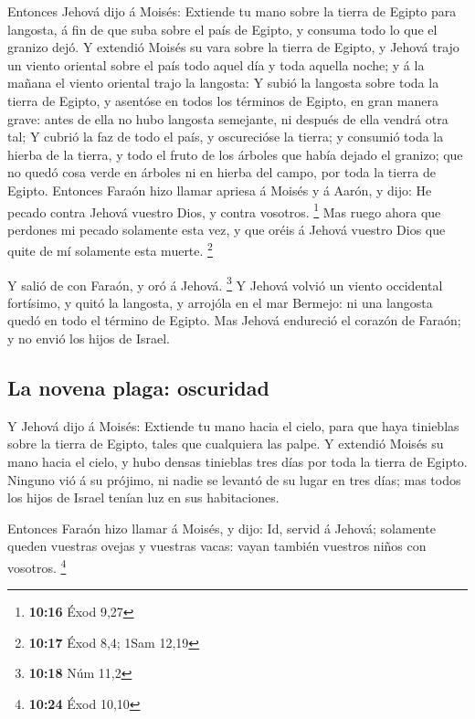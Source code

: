  Entonces Jehová dijo á Moisés: Extiende tu mano sobre la
tierra de Egipto para langosta, á fin de que suba sobre el país de
Egipto, y consuma todo lo que el granizo dejó.  Y extendió
Moisés su vara sobre la tierra de Egipto, y Jehová trajo un viento
oriental sobre el país todo aquel día y toda aquella noche; y á la
mañana el viento oriental trajo la langosta:  Y subió la
langosta sobre toda la tierra de Egipto, y asentóse en todos los
términos de Egipto, en gran manera grave: antes de ella no hubo langosta
semejante, ni después de ella vendrá otra tal;  Y cubrió la
faz de todo el país, y oscurecióse la tierra; y consumió toda la hierba
de la tierra, y todo el fruto de los árboles que había dejado el
granizo; que no quedó cosa verde en árboles ni en hierba del campo, por
toda la tierra de Egipto.  Entonces Faraón hizo llamar
apriesa á Moisés y á Aarón, y dijo: He pecado contra Jehová vuestro
Dios, y contra vosotros. \footnote{\textbf{10:16} Éxod 9,27}
 Mas ruego ahora que perdones mi pecado solamente esta vez,
y que oréis á Jehová vuestro Dios que quite de mí solamente esta muerte.
\footnote{\textbf{10:17} Éxod 8,4; 1Sam 12,19}

 Y salió de con Faraón, y oró á Jehová. \footnote{\textbf{10:18}
  Núm 11,2}  Y Jehová volvió un viento occidental
fortísimo, y quitó la langosta, y arrojóla en el mar Bermejo: ni una
langosta quedó en todo el término de Egipto.  Mas Jehová
endureció el corazón de Faraón; y no envió los hijos de Israel.

\hypertarget{la-novena-plaga-oscuridad}{%
\subsection{La novena plaga:
oscuridad}\label{la-novena-plaga-oscuridad}}

 Y Jehová dijo á Moisés: Extiende tu mano hacia el cielo,
para que haya tinieblas sobre la tierra de Egipto, tales que cualquiera
las palpe.  Y extendió Moisés su mano hacia el cielo, y
hubo densas tinieblas tres días por toda la tierra de Egipto.
 Ninguno vió á su prójimo, ni nadie se levantó de su lugar
en tres días; mas todos los hijos de Israel tenían luz en sus
habitaciones.

 Entonces Faraón hizo llamar á Moisés, y dijo: Id, servid á
Jehová; solamente queden vuestras ovejas y vuestras vacas: vayan también
vuestros niños con vosotros. \footnote{\textbf{10:24} Éxod 10,10}

